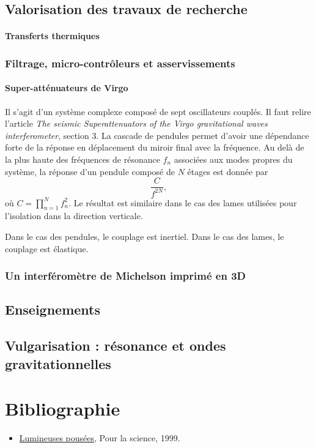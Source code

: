 \documentclass[12pt,a4paper]{article}
\begin{document}
\subsection{Valorisation des travaux de recherche}

\paragraph{Transferts thermiques\\}

\subsubsection{Filtrage, micro-contrôleurs et asservissements}
\label{sec:controls}

\paragraph{Super-atténuateurs de Virgo\\}

Il s'agit d'un système complexe composé de sept oscillateurs couplés.
Il faut relire l'article \emph{The seismic Superattenuators of the Virgo gravitational waves interferometer}, section 3.
La cascade de pendules permet d'avoir une dépendance forte de la réponse en déplacement du miroir final avec la fréquence.
Au delà de la plus haute des fréquences de résonance $f_n$ associées aux modes propres du système, la réponse d'un pendule composé de $N$ étages est donnée par
\begin{equation}
\frac{C}{f^{2N}},
\end{equation}
où $C = \prod_{n=1}^N f_n^2$.
Le résultat est similaire dans le cas des lames utilisées pour l'isolation dans la direction verticale.

Dans le cas des pendules, le couplage est inertiel.
Dans le cas des lames, le couplage est élastique.


\subsubsection{Un interféromètre de Michelson imprimé en 3D}

\subsection{Enseignements}

\subsection{Vulgarisation : résonance et ondes gravitationnelles}

\section*{Bibliographie}

\begin{itemize}
\item \href{https://www.pourlascience.fr/sd/physique/lumineuses-poussees-1143.php}{Lumineuses pousées}, Pour la science, 1999.
\end{itemize}
\end{document}
